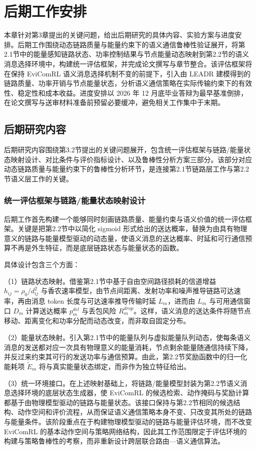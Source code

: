 \section{后期工作安排}
本章针对第3章提出的关键问题，给出后期研究的具体内容、实验方案与进度安排。后期工作围绕动态链路质量与能量约束下的语义通信鲁棒性验证展开，将第2.1节中的能量感知链路状态、功率控制结果与节点能量动态映射到第2.2节的语义消息选择环境中，构建统一评估框架，并完成论文撰写与章节整合。该评估框架将在保持 EviComRL 语义消息选择机制不变的前提下，引入由 LEADR 建模得到的链路质量、功率开销与节点能量状态，分析语义通信策略在实际传输约束下的有效性、稳定性和成本收益。进度安排以 2026 年 12 月底毕业答辩为最早基准倒排，在论文撰写与送审材料准备前预留必要缓冲，避免相关工作集中于末期。

\subsection{后期研究内容}
后期研究内容围绕第3.2节提出的关键问题展开，包含统一评估框架与链路/能量状态映射设计、对比条件与评价指标设计、以及鲁棒性分析方案三部分。该部分对应动态链路质量与能量约束下的鲁棒性分析环节，是连接第2.1节链路层工作与第2.2节语义层工作的关键。

\subsubsection{统一评估框架与链路/能量状态映射设计}
后期工作首先构建一个能够同时刻画链路质量、能量约束与语义价值的统一评估框架。关键是把第2.2节中以简化 sigmoid 形式给出的送达概率，替换为由具有物理意义的链路与能量模型驱动的动态量，使语义消息的送达概率、时延和可行通信预算不再是外生特征，而是底层链路状态与能量状态的函数。

具体设计包含三个方面：

（1）链路状态映射。借鉴第2.1节中基于自由空间路径损耗的信道增益 $h_{ij}=\rho_0/d_{ij}^2$ 与香农速率模型，由节点间距离、发射功率和噪声推导链路可达速率，再由消息 token 长度与可达速率推导传输时延 $L_m$，进而由 $L_m$ 与可用通信窗口 $D_m$ 计算送达概率 $p_m^{del}$ 与丢包风险 $R_m^{drop}$。这样，语义消息的送达条件将随节点移动、距离变化和功率分配而动态改变，而非取自固定分布。

（2）能量状态映射。引入第2.1节中的能量队列与虚拟能量队列动态，使每条语义消息的发送都对应一次具有物理意义的能量消耗，节点剩余能量随通信持续下降，并反过来约束其可行的发送功率与通信预算。由此，第2.2节奖励函数中的归一化能耗项 $\tilde{E}_m$ 将与真实能量状态绑定，而非作为独立特征给出。

（3）统一环境接口。在上述映射基础上，将链路/能量模型封装为第2.2节语义消息选择环境的底层状态生成器，使 EviComRL 的候选检索、动作掩码与奖励计算都基于由物理模型驱动的链路与能量状态。该接口保持与第2.2节相同的候选结构、动作空间和评价流程，从而保证语义通信策略本身不变、只改变其所处的链路与能量条件。该阶段重点在于构建物理模型驱动的链路与能量评估环境，而不改变 EviComRL 的基本动作空间与策略网络结构，因此其工作范围限定于评估环境的构建与策略鲁棒性的考察，而非重新设计跨层联合路由—语义通信算法。

